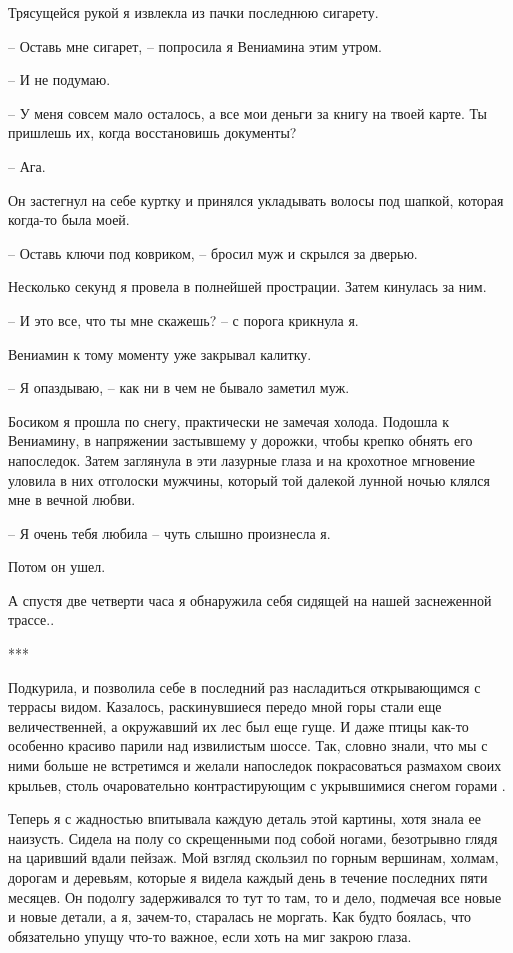 \documentclass[
]{book}
\begin{document}
Трясущейся рукой я извлекла из пачки последнюю сигарету.

-- Оставь мне сигарет, -- попросила я Вениамина этим утром.

-- И не подумаю.

-- У меня совсем мало осталось, а все мои деньги за книгу на твоей карте. Ты пришлешь их, когда восстановишь документы?

-- Ага.

Он застегнул на себе куртку и принялся укладывать волосы под шапкой, которая когда-то была моей.

-- Оставь ключи под ковриком, -- бросил муж и скрылся за дверью.

Несколько секунд я провела в полнейшей прострации. Затем кинулась за ним.

-- И это все, что ты мне скажешь? -- с порога крикнула я.

Вениамин к тому моменту уже закрывал калитку.

-- Я опаздываю, -- как ни в чем не бывало заметил муж.

Босиком я прошла по снегу, практически не замечая холода. Подошла к Вениамину, в напряжении застывшему у дорожки, чтобы крепко обнять его напоследок. Затем заглянула в эти лазурные глаза и на крохотное мгновение уловила в них отголоски мужчины, который той далекой лунной ночью клялся мне в вечной любви.

-- Я очень тебя любила -- чуть слышно произнесла я.

Потом он ушел.

А спустя две четверти часа я обнаружила себя сидящей на нашей заснеженной трассе..

***

Подкурила, и позволила себе в последний раз насладиться открывающимся с террасы видом. Казалось, раскинувшиеся передо мной горы стали еще величественней, а окружавший их лес был еще гуще. И даже птицы как-то особенно красиво парили над извилистым шоссе. Так, словно знали, что мы с ними больше не встретимся и желали напоследок покрасоваться размахом своих крыльев, столь очаровательно контрастирующим с укрывшимися снегом горами .

Теперь я с жадностью впитывала каждую деталь этой картины, хотя знала ее наизусть. Сидела на полу со скрещенными под собой ногами, безотрывно глядя на царивший вдали пейзаж. Мой взгляд скользил по горным вершинам, холмам, дорогам и деревьям, которые я видела каждый день в течение последних пяти месяцев. Он подолгу задерживался то тут то там, то и дело, подмечая все новые и новые детали, а я, зачем-то, старалась не моргать. Как будто боялась, что обязательно упущу что-то важное, если хоть на миг закрою глаза.
\end{document}
